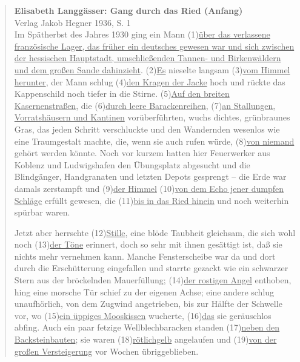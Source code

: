 \begin{nohyphens}
  \begin{quote}
    \textbf{Elisabeth Langgässer: Gang durch das Ried (Anfang)}\\
    Verlag Jakob Hegner 1936, S. 1\\[0.5\baselineskip]

    Im Spätherbst des Jahres 1930 ging ein Mann (1)\ul{über das verlassene französische Lager, das früher ein deutsches gewesen war und sich zwischen der hessischen Hauptstadt, umschließenden Tannen- und Birkenwäldern und dem großen Sande dahinzieht}.
    (2)\ul{Es} nieselte langsam (3)\ul{vom Himmel herunter}, der Mann schlug (4)\ul{den Kragen der Jacke} hoch und rückte das Kappenschild noch tiefer in die Stirne.
    (5)\ul{Auf den breiten Kasernenstraßen}, die (6)\ul{durch leere Barackenreihen}, (7)\ul{an Stallungen, Vorratshäusern und Kantinen} vorüberführten, wuchs dichtes, grünbraunes Gras, das jeden Schritt verschluckte und den Wandernden wesenlos wie eine Traumgestalt machte, die, wenn sie auch rufen würde, (8)\ul{von niemand} gehört werden könnte.
    Noch vor kurzem hatten hier Feuerwerker aus Koblenz und Ludwigshafen den Übungsplatz abgesucht und die Blindgänger, Handgranaten und letzten Depots gesprengt – die Erde war damals zerstampft und (9)\ul{der Himmel} (10)\ul{von dem Echo jener dumpfen Schläge} erfüllt gewesen, die (11)\ul{bis in das Ried hinein} und noch weiterhin spürbar waren.

      Jetzt aber herrschte (12)\ul{Stille}, eine blöde Taubheit gleichsam, die sich wohl noch (13)\ul{der Töne} erinnert, doch so sehr mit ihnen gesättigt ist, daß sie nichts mehr vernehmen kann.
      Manche Fensterscheibe war da und dort durch die Erschütterung eingefallen und starrte gezackt wie ein schwarzer Stern aus der bröckelnden Mauerfüllung; (14)\ul{der rostigen Angel} enthoben, hing eine morsche Tür schief zu der eigenen Achse; eine andere schlug unaufhörlich, von dem Zugwind angetrieben, bis zur Hälfte der Schwelle vor, wo (15)\ul{ein üppiges Mooskissen} wucherte, (16)\ul{das} sie geräuschlos abfing.
      Auch ein paar fetzige Wellblechbaracken standen (17)\ul{neben den Backsteinbauten}; sie waren (18)\ul{rötlichgelb} angelaufen und (19)\ul{von der großen Versteigerung} vor Wochen übriggeblieben.


\end{quote}
\end{nohyphens}
